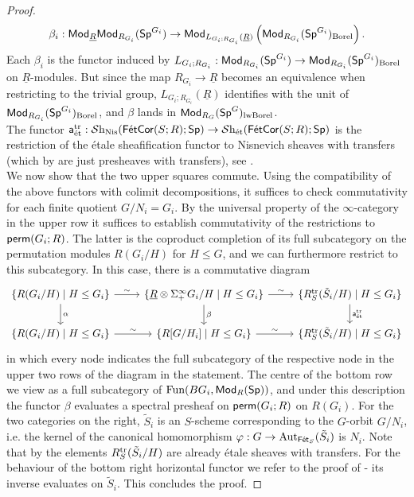 \documentclass[reqno]{amsart}
\numberwithin{equation}{section}\theoremstyle{thms}
\theoremstyle{defn}
\newcommand{\tn}[1]{\textnormal{#1}}
\newcommand{\tsf}[1]{\textsf{\textup{#1}}}
\newcommand{\mcal}[1]{\mathcal{#1}}
\newcommand{\underl}[1]{\underline{#1}}
\newcommand{\fun}{\tn{Fun}}
\newcommand{\sheaves}{\mcal{S}\tn{h}}
\newcommand{\Mod}{\tsf{Mod}}
\newcommand{\spec}{\tsf{Sp}}
\newcommand{\specg}{\tsf{Sp}^G}
\newcommand{\perm}{\tsf{perm}}
\newcommand{\fets}{\tsf{Fét}_S}
\newcommand{\corfets}[1]{\tsf{FétCor}(S;#1)}
\begin{document}
\begin{proof}
$$\beta_i: \Mod_{\underl{R}}\Mod_{R_{G_i}}(\spec^{G_i}) \to \Mod_{L_{G_i;R_{G_i}}(\underl{R})}\left(\Mod_{R_{G_i}}(\spec^{G_i})_{\tn{Borel}}\right).$$
Each $\beta_i$ is the functor induced by $L_{G_i;R_{G_i}}: \Mod_{R_{G_i}}(\spec^{G_i}) \to \Mod_{R_{G_i}}(\spec^{G_i})_{\tn{Borel}}$ on $\underl{R}$-modules. But since the map $R_{G_i} \to \underl{R}$ becomes an equivalence when restricting to the trivial group, $L_{G_i;R_{G_i}}(\underl{R})$ identifies with the unit of $\Mod_{R_{G_i}}(\spec^{G_i})_{\tn{Borel}}$, and $\beta$ lands in $\Mod_{R_G}(\specg)_{\tn{lwBorel}}$.\\
The functor $\tsf{a}_{\tn{ét}}^{\tn{tr}}: \sheaves_{\tn{Nis}}(\corfets{R};\spec) \to \sheaves_{\tn{ét}}(\corfets{R};\spec)$ is the restriction of the étale sheafification functor to Nisnevich sheaves with transfers (which by  are just presheaves with transfers), see . \\
We now show that the two upper squares commute. Using the compatibility of the above functors with colimit decompositions, it suffices to check commutativity for each finite quotient $G/N_i=G_i$. By the universal property of the $\infty$-category in the upper row \cite[Corollary 3.17]{fuh25} it suffices to establish commutativity of the restrictions to $\perm(G_i;R)$. The latter is the coproduct completion of its full subcategory on the permutation modules $R(G_i/H)$ for $H\leq G$, and we can furthermore restrict to this subcategory. In this case, there is a commutative diagram
\[\begin{tikzcd}
	{\{R(G_i/H) \mid H \leq G_i\}} & {\{\underl{R} \otimes \Sigma^{\infty}_+G_i/H \mid H \leq G_i\}} & {\{R^{\tn{tr}}_S(\tilde{S}_i/H) \mid H \leq G_i\}} \\
	{\{R(G_i/H) \mid H \leq G_i\}} & {\{R[G/H_i] \mid H \leq G_i\}} & {\{R^{\tn{tr}}_S(\tilde{S}_i/H) \mid H \leq G_i\}}
	\arrow["\sim", from=1-1, to=1-2]
	\arrow["\alpha", from=1-1, to=2-1]
	\arrow["\sim", from=1-2, to=1-3]
	\arrow["\beta", from=1-2, to=2-2]
	\arrow["{\tsf{a}^{\tn{tr}}_{\tn{ét}}}", from=1-3, to=2-3]
	\arrow["\sim", from=2-1, to=2-2]
	\arrow["\sim", from=2-2, to=2-3]
\end{tikzcd}\]
in which every node indicates the full subcategory of the respective node in the upper two rows of the diagram in the statement. The centre of the bottom row we view as a full subcategory of $\fun(BG_i,\Mod_R(\spec))$, and under this description the functor $\beta$ evaluates a spectral presheaf on $\perm(G_i;R)$ on $R(G_i)$. For the two categories on the right, $\tilde{S}_i$ is an $S$-scheme corresponding to the $G$-orbit $G/N_i$, i.e. the kernel of the canonical homomorphism $\varphi: G \to \tn{Aut}_{\fets}(\tilde{S}_i)$ is $N_i$. Note that by  the elements $R^{\tn{tr}}_S(\tilde{S}_i/H)$ are already étale sheaves with transfers. For the behaviour of the bottom right horizontal functor we refer to the proof of  - its inverse evaluates on $\tilde{S}_i$. This concludes the proof.
\end{proof}
\end{document}
